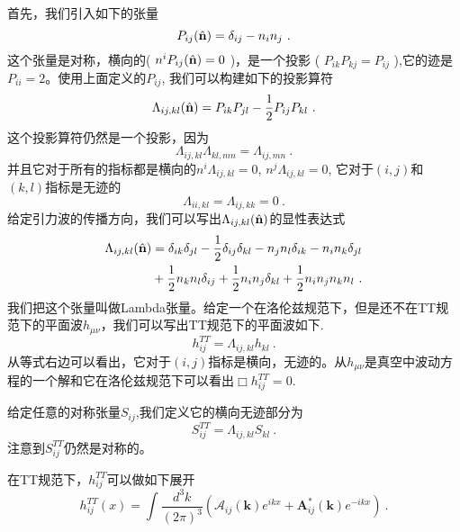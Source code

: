 首先，我们引入如下的张量
\begin{equation}
P_{ij} (\hat{\bf{n}} ) = \delta_{ij} - n_in_j~.
\end{equation}
这个张量是对称，横向的( $ n^iP_{ij}(\hat{\bf{n}}) = 0 $ )，是一个投影 ( $ P_{ik} P_{kj} = P_{ij} $ ),它的迹是$P_{ii} = 2$。使用上面定义的$P_{ij}$, 我们可以构建如下的投影算符
\begin{equation}
\Lambda_{ij,kl} ( \hat{\bf{n}} )  = P_{ik} P_{jl} - \frac{1}{2} P_{ij} P_{kl} ~. 
\end{equation}
这个投影算符仍然是一个投影，因为
\begin{equation}
\Lambda_{ij,kl} \Lambda_{kl,mn} = \Lambda_{ij,mn} ~. 
\end{equation}
并且它对于所有的指标都是横向的$ n^i \Lambda_{ij,kl} = 0 $, $ n^j \Lambda_{ij,kl} = 0 $, 它对于$(i,j)$和$(k,l)$指标是无迹的
\begin{equation}
\Lambda_{ii,kl} = \Lambda_{ij,kk} = 0 ~. 
\end{equation}
给定引力波的传播方向，我们可以写出$\Lambda_{ij,kl} (\hat{ {\bf n} })$的显性表达式
\begin{equation}
\begin{aligned}
\Lambda_{ij,kl} (\hat{ {\bf n} }   ) & = \delta_{ik} \delta_{jl} - \frac{1}{2} \delta_{ij} \delta_{kl} - n_j n_l \delta_{ik} - n_i n_k \delta_{jl} \\
& + \frac{1}{2} n_k n_l \delta_{ij} + \frac{1}{2} n_i n_j \delta_{kl} + \frac{1}{2} n_i n_j n_k n_l ~.
\end{aligned}
\end{equation}
我们把这个张量叫做Lambda张量。给定一个在洛伦兹规范下，但是还不在TT规范下的平面波$h_{\mu\nu}$，我们可以写出TT规范下的平面波如下.
\begin{equation}
h_{ij}^{TT} = \Lambda_{ij,kl} h_{kl} ~.
\end{equation}
从等式右边可以看出，它对于$(i,j)$指标是横向，无迹的。从$h_{\mu\nu}$是真空中波动方程的一个解和它在洛伦兹规范下可以看出$\Box h_{ij}^{TT} = 0$. 

给定任意的对称张量$S_{ij}$,我们定义它的横向无迹部分为
\begin{equation}
S^{TT}_{ij} = \Lambda_{ij,kl} S_{kl} ~.
\end{equation}
注意到$S^{TT}_{ij}$仍然是对称的。

在TT规范下，$h^{TT}_{ij}$可以做如下展开
\begin{equation}
h^{TT}_{ij}(x) = \int \frac{d^3 k}{(2\pi)^3} (\mathcal A_{ij}(\mathbf k) e^{ikx} + \mathbf A_{ij}^* (\mathbf k) e^{-i k x} ) ~. 
\end{equation}



















